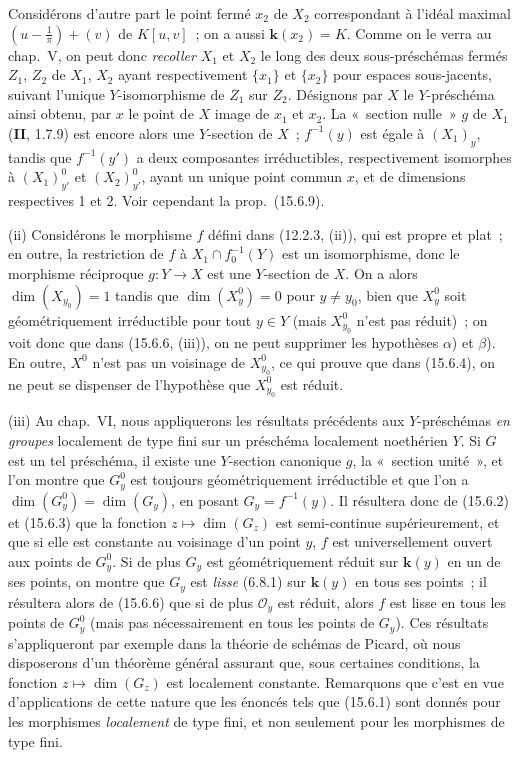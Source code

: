 Considérons d'autre part le point fermé $x_2$ de $X_2$ correspondant à l'idéal maximal $\left(u-\frac{1}{\pi}\right)+(v)$ de $K[u,v]$~; on a aussi $\mathbf{k}(x_2)=K$. Comme on le verra au chap.~V, on peut donc \emph{recoller} $X_1$ et $X_2$ le long des deux sous-préschémas fermés $Z_1$, $Z_2$ de $X_1$, $X_2$ ayant respectivement $\{x_1\}$ et $\{x_2\}$ pour espaces sous-jacents, suivant l'unique $Y$-isomorphisme de $Z_1$ sur $Z_2$. Désignons par $X$ le $Y$-préschéma ainsi obtenu, par $x$ le point de $X$ image de $x_1$ et $x_2$. La «~section nulle~» $g$ de $X_1$ (\textbf{II}, 1.7.9) est encore alors une $Y$-section de $X$~; $f^{-1}(y)$ est égale à $(X_1)_y$, tandis que $f^{-1}(y')$ a deux composantes irréductibles, respectivement isomorphes à $(X_1)_{y'}^0$ et $(X_2)_{y'}^0$, ayant un unique point commun $x$, et de dimensions respectives 1 et 2. Voir cependant la prop.~(15.6.9).

(ii) Considérons le morphisme $f$ défini dans (12.2.3, (ii)), qui est propre et plat~; en outre, la restriction de $f$ à $X_1\cap f_0^{-1}(Y)$ est un isomorphisme, donc le morphisme réciproque $g:Y\to X$ est une $Y$-section de $X$. On a alors $\dim(X_{y_0})=1$ tandis que $\dim(X_y^0)=0$ pour $y\ne y_0$, bien que $X_y^0$ soit géométriquement irréductible pour tout $y\in Y$ (mais $X_{y_0}^0$ n'est pas réduit)~; on voit donc que dans (15.6.6, (iii)), on ne peut supprimer les hypothèses $\alpha$) et $\beta$). En outre, $X^0$ n'est pas un voisinage de $X_{y_0}^{0}$, ce qui prouve que dans (15.6.4), on ne peut se dispenser de l'hypothèse que $X_{y_0}^0$ est réduit.

(iii) Au chap.~VI, nous appliquerons les résultats précédents aux $Y$-préschémas \emph{en groupes} localement de type fini sur un préschéma localement noethérien $Y$. Si $G$ est un tel préschéma, il existe une $Y$-section canonique $g$, la «~section unité~», et l'on montre que $G_y^0$ est toujours géométriquement irréductible et que l'on a $\dim(G_y^0)=\dim(G_y)$, en posant $G_y=f^{-1}(y)$. Il résultera donc de (15.6.2) et (15.6.3) que la fonction $z\mapsto\dim(G_z)$ est semi-continue supérieurement, et que si elle est constante au voisinage d'un point $y$, $f$ est universellement ouvert aux points de $G_y^0$. Si de plus $G_y$ est géométriquement réduit sur $\mathbf{k}(y)$ en un de ses points, on montre que $G_y$ est \emph{lisse} (6.8.1) sur $\mathbf{k}(y)$ en tous ses points~; il résultera alors de (15.6.6) que si de plus $\mathcal O_y$ est réduit, alors $f$ est lisse en tous les points de $G_y^0$ (mais pas nécessairement en tous les points de $G_y$). Ces résultats s'appliqueront par exemple dans la théorie de schémas de Picard, où nous disposerons d'un théorème général assurant que, sous certaines conditions, la fonction $z\mapsto\dim(G_z)$ est localement constante. Remarquons que c'est en vue d'applications de cette nature que les énoncés tels que (15.6.1) sont donnés pour les morphismes \emph{localement} de type fini, et non seulement pour les morphismes de type fini.

